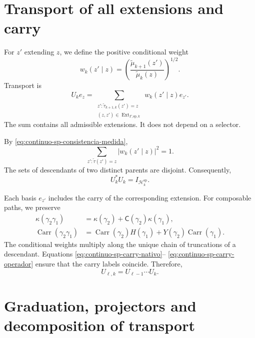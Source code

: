 \section{Transport of all extensions and carry}

For \(z'\) extending \(z\), we define the positive conditional weight
\begin{equation}
\label{eq:continuo-sp-peso-condicional}
 w_k(z'\mid z)
 =\left(\frac{\widetilde\mu_{k+1}(z')}
               {\widetilde\mu_k(z)}\right)^{1/2}.
\end{equation}
Transport is
\begin{equation}
\label{eq:continuo-sp-u-accion}
 U_ke_z
 =\sum_{\substack{z':\widetilde\tau_{k+1,k}(z')=z\\
            (z,z')\in\operatorname{Ext}_{\Gamma,\mathrm{sp},k}}}
 w_k(z'\mid z)e_{z'}.
\end{equation}
The sum contains all admissible extensions. It does not depend on a selector.

By \eqref{eq:continuo-sp-consistencia-medida},
\[
 \sum_{z':\widetilde\tau(z')=z}|w_k(z'\mid z)|^2=1.
\]
The sets of descendants of two distinct parents are disjoint. Consequently,
\begin{equation}
\label{eq:continuo-sp-u-isometria}
 U_k^*U_k=I_{\mathcal H_k^{\mathrm{sp}}}.
\end{equation}

Each basis \(e_{z'}\) includes the carry of the corresponding extension. For
composable paths, we preserve
\begin{align}
 \kappa(\gamma_2\gamma_1)
 &=\kappa(\gamma_2)+
   \mathsf C(\gamma_2)\kappa(\gamma_1),
 \label{eq:continuo-sp-carry-nativo}\\
 \operatorname{Carr}(\gamma_2\gamma_1)
 &=\operatorname{Carr}(\gamma_2)H(\gamma_1)
  +Y(\gamma_2)\operatorname{Carr}(\gamma_1).
 \label{eq:continuo-sp-carry-operador}
\end{align}
The conditional weights multiply along the unique chain of
truncations of a descendant. Equations
\eqref{eq:continuo-sp-carry-nativo}--
\eqref{eq:continuo-sp-carry-operador} ensure that the carry labels
coincide. Therefore,
\begin{equation}
\label{eq:continuo-sp-u-composicion}
 U_{\ell,k}=U_{\ell-1}\cdots U_k.
\end{equation}

\section{Graduation, projectors and decomposition of transport}

